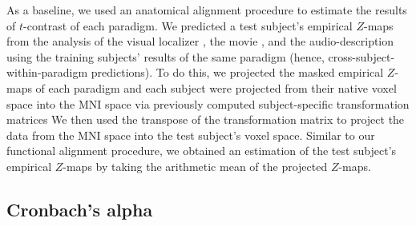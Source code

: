 

%
As a baseline, we used an anatomical alignment procedure to estimate the results
of $t$-contrast of each paradigm.
%
We predicted a test subject's empirical $Z$-maps from the analysis of
%
the visual localizer \citep{sengupta2016extension},
%
the movie \citep{haeusler2022processing}, and
%
the audio-description \citep{haeusler2022processing}
%
using the training subjects' results of the same paradigm (hence,
cross-subject-within-paradigm predictions).
%
To do this, we projected the masked empirical $Z$-maps of each paradigm and each
subject were projected from their native voxel space into the MNI space via
previously computed subject-specific transformation matrices
\citep[][\href{https://github.com/psychoinformatics-de/studyforrest-data-templatetransforms}{\url{github.com/psychoinformatics-de/studyforrest-data-templatetransforms}}]{hanke2014audiomovie}
We then used the transpose of the transformation matrix to project the data from
the MNI space into the test subject's voxel space.
Similar to our functional alignment procedure, we obtained an estimation of the
test subject's empirical $Z$-maps by taking the arithmetic mean of the projected
$Z$-maps.



\subsection{Cronbach's alpha}






